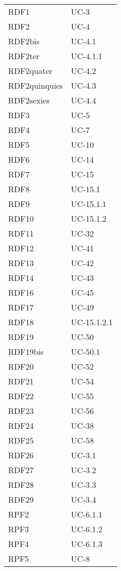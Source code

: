\begin{longtable}{| p{5cm} | p{5cm} |}
		RDF1 & UC-3\\
		RDF2 & UC-4\\
		RDF2bis & UC-4.1 \\
		RDF2ter & UC-4.1.1 \\
		RDF2quater & UC-4.2 \\
		RDF2quinquies & UC-4.3 \\
		RDF2sexies & UC-4.4 \\
		\rowcolor{LightGray}
		RDF3 & UC-5\\
		RDF4 & UC-7\\
		\rowcolor{LightGray}
		RDF5 & UC-10\\
		RDF6 & UC-14\\
		\rowcolor{LightGray}
		RDF7 & UC-15\\
		RDF8 & UC-15.1\\
		\rowcolor{LightGray}
		RDF9 & UC-15.1.1\\
		RDF10 & UC-15.1.2\\
		\rowcolor{LightGray}
		RDF11 & UC-32\\
		RDF12 & UC-41\\
		\rowcolor{LightGray}
		RDF13 & UC-42\\
		RDF14 & UC-43\\
		\rowcolor{LightGray}
		RDF16 & UC-45\\
		RDF17 & UC-49 \\
		\rowcolor{LightGray}
		RDF18 & UC-15.1.2.1 \\
		RDF19 & UC-50 \\
		RDF19bis & UC-50.1 \\
		\rowcolor{LightGray}
		RDF20 & UC-52 \\
		RDF21 & UC-54 \\
		\rowcolor{LightGray}
		RDF22 & UC-55 \\
		RDF23 & UC-56 \\
		\rowcolor{LightGray}
		RDF24 & UC-38\\
		RDF25 & UC-58\\
		\rowcolor{LightGray}
		RDF26 & UC-3.1\\
		RDF27 & UC-3.2\\
		\rowcolor{LightGray}
		RDF28 & UC-3.3\\
		RDF29 & UC-3.4\\
		\rowcolor{LightGray}
		RPF2 & UC-6.1.1\\
		\rowcolor{LightGray}
		RPF3 & UC-6.1.2\\
		RPF4 & UC-6.1.3\\
		\rowcolor{LightGray}
		RPF5 & UC-8\\

\end{longtable}
